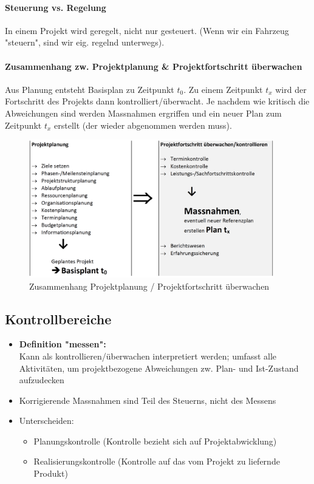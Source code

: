 \documentclass[a4paper]{article}
\begin{document}
	\paragraph{Steuerung vs. Regelung}
	
	In einem Projekt wird geregelt, nicht nur gesteuert.
	(Wenn wir ein Fahrzeug "steuern", sind wir eig. regelnd unterwegs).
	
	\paragraph{Zusammenhang zw. Projektplanung \& Projektfortschritt überwachen}
	
	Aus Planung entsteht Basisplan zu Zeitpunkt $t_{0}$.
	Zu einem Zeitpunkt $t_{x}$ wird der Fortschritt des Projekts dann kontrolliert/überwacht.
	Je nachdem wie kritisch die Abweichungen sind werden Massnahmen ergriffen und ein neuer Plan zum Zeitpunkt $t_{x}$ erstellt (der wieder abgenommen werden muss).
	
	\begin{figure}[!htb]
		\centering
		\includegraphics[height=6cm]{img/pm/basisplan.png}
		\caption{Zusammenhang Projektplanung / Projektfortschritt überwachen}
		\label{fig:pm_basisplan}
	\end{figure}

\newpage

		\subsection{Kontrollbereiche}
		
		\begin{itemize}
			\item \textbf{Definition "messen":}\\
			Kann als kontrollieren/überwachen interpretiert werden; 
			umfasst alle Aktivitäten, um projektbezogene Abweichungen zw. Plan- und Ist-Zustand aufzudecken
			\item Korrigierende Massnahmen sind Teil des Steuerns, nicht des Messens
			\item Unterscheiden:
				\begin{itemize}
					\item Planungskontrolle (Kontrolle bezieht sich auf Projektabwicklung)
					\item Realisierungskontrolle (Kontrolle auf das vom Projekt zu liefernde Produkt)
				\end{itemize}
		\end{itemize}
	
\end{document}
